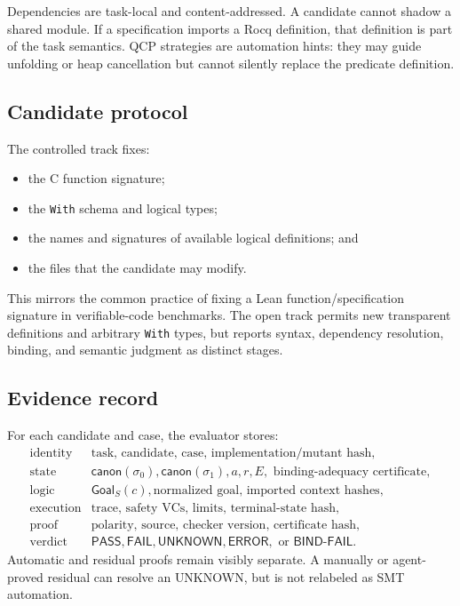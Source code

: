\documentclass[10pt]{article}
\newcommand{\rocq}{Rocq}
\newcommand{\pass}{\textsf{PASS}}
\newcommand{\fail}{\textsf{FAIL}}
\newcommand{\unknown}{\textsf{UNKNOWN}}
\newcommand{\error}{\textsf{ERROR}}
\newcommand{\bindfail}{\textsf{BIND-FAIL}}
\newcommand{\goal}{\mathsf{Goal}}
\newcommand{\canon}{\mathsf{canon}}
\begin{document}
Dependencies are task-local and content-addressed.  A candidate cannot shadow a
shared module.  If a specification imports a \rocq{} definition, that
definition is part of the task semantics.  QCP strategies are automation
hints: they may guide unfolding or heap cancellation but cannot silently
replace the predicate definition.

\subsection{Candidate protocol}

The controlled track fixes:
\begin{itemize}[leftmargin=1.4em]
  \item the C function signature;
  \item the \texttt{With} schema and logical types;
  \item the names and signatures of available logical definitions; and
  \item the files that the candidate may modify.
\end{itemize}
This mirrors the common practice of fixing a Lean function/specification
signature in verifiable-code benchmarks.  The open track permits new
transparent definitions and arbitrary \texttt{With} types, but reports syntax,
dependency resolution, binding, and semantic judgment as distinct stages.

\subsection{Evidence record}

For each candidate and case, the evaluator stores:
\[
\begin{array}{ll}
\text{identity} & \text{task, candidate, case, implementation/mutant hash},\\
\text{state} & \canon(\sigma_0),\canon(\sigma_1),a,r,E,
                  \text{ binding-adequacy certificate},\\
\text{logic} & \goal_S(c),\text{normalized goal, imported context hashes},\\
\text{execution} & \text{trace, safety VCs, limits, terminal-state hash},\\
\text{proof} & \text{polarity, source, checker version, certificate hash},\\
\text{verdict} & \pass,\fail,\unknown,\error,\text{ or }\bindfail.
\end{array}
\]
Automatic and residual proofs remain visibly separate.  A manually or
agent-proved residual can resolve an \unknown{}, but is not relabeled as SMT
automation.
\end{document}
